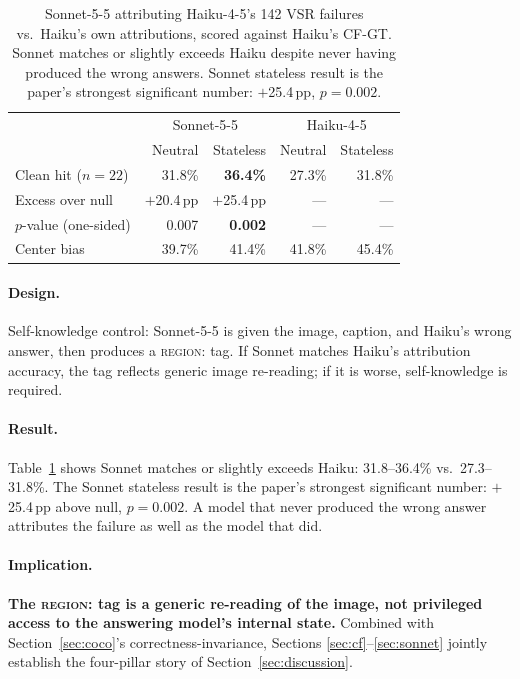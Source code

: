 \documentclass[twoside,11pt]{article}
\begin{document}
\begin{table}[t]
\centering
\small
\begin{tabular}{lrrrr}
\toprule
 & \multicolumn{2}{c}{Sonnet-5-5} & \multicolumn{2}{c}{Haiku-4-5} \\
 & Neutral & Stateless & Neutral & Stateless \\
\midrule
Clean hit ($n{=}22$) & 31.8\% & \textbf{36.4\%} & 27.3\% & 31.8\% \\
Excess over null & $+$20.4\,pp & $+$25.4\,pp & — & — \\
$p$-value (one-sided) & 0.007 & \textbf{0.002} & — & — \\
Center bias & 39.7\% & 41.4\% & 41.8\% & 45.4\% \\
\bottomrule
\end{tabular}
\caption{Sonnet-5-5 attributing Haiku-4-5's 142 VSR failures vs.\ Haiku's
own attributions, scored against Haiku's CF-GT.
Sonnet matches or slightly exceeds Haiku despite never having produced the
wrong answers. Sonnet stateless result is the paper's strongest significant
number: $+$25.4\,pp, $p{=}0.002$.}
\label{tab:sonnet}
\end{table}

\paragraph{Design.}
Self-knowledge control: Sonnet-5-5 is given the image, caption, and
Haiku's wrong answer, then produces a \textsc{region:} tag.
If Sonnet matches Haiku's attribution accuracy, the tag reflects generic image
re-reading; if it is worse, self-knowledge is required.

\paragraph{Result.}
Table~\ref{tab:sonnet} shows Sonnet matches or slightly exceeds Haiku:
31.8--36.4\% vs.\ 27.3--31.8\%.
The Sonnet stateless result is the paper's strongest significant number:
$+$25.4\,pp above null, $p{=}0.002$.
A model that never produced the wrong answer attributes the failure as well as
the model that did.

\paragraph{Implication.}
\textbf{The \textsc{region:} tag is a generic re-reading of the image, not
privileged access to the answering model's internal state.}
Combined with Section~\ref{sec:coco}'s correctness-invariance, Sections
\ref{sec:cf}--\ref{sec:sonnet} jointly establish the four-pillar story of
Section~\ref{sec:discussion}.
\end{document}
